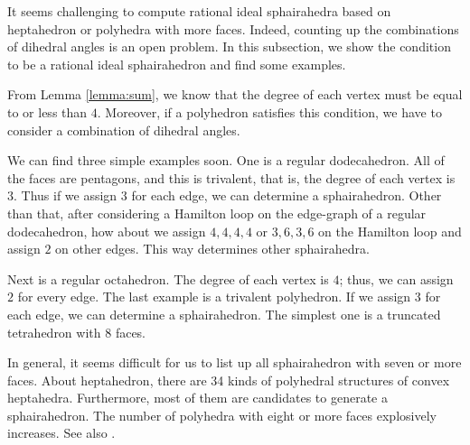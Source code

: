 \documentclass[suppldata, dvipdfmx]{interact}
\theoremstyle{plain}%
\theoremstyle{definition}
\theoremstyle{remark}
\theoremstyle{problemstyle}
\begin{document}
It seems challenging to compute rational ideal sphairahedra based on
heptahedron or polyhedra with more faces.
Indeed, counting up the combinations of dihedral angles is an open problem.  In this subsection, we show the condition to be a rational ideal sphairahedron and find some examples. 

From Lemma \ref{lemma:sum},  we know that the degree of each vertex must be equal to or less than $4$.  Moreover, if a polyhedron satisfies this condition, we have to consider a combination of dihedral angles. 

We can find three simple examples soon.  One is a regular dodecahedron.  All of the faces are pentagons, and this is trivalent, that is, the degree of each vertex is $3$.  Thus if we assign $3$ for each edge,  we can determine a sphairahedron.  Other than that, after considering a Hamilton loop on the edge-graph of a regular dodecahedron, how about we assign $4,4,4,4$ or $3,6,3,6$ on the Hamilton loop and assign $2$ on other edges.  This way determines other sphairahedra.  

Next is a regular octahedron.  The degree of each vertex is $4$; thus, we can assign $2$ for every edge.
The last example is a trivalent polyhedron.   If we assign $3$ for each edge,  we can determine a sphairahedron.  The simplest one is a truncated tetrahedron with $8$ faces.

In general, it seems difficult for us to list up all sphairahedron with seven or more faces.  About heptahedron, there are 34 kinds of polyhedral structures of convex heptahedra.  Furthermore, most of them are candidates to generate a sphairahedron.  The number of polyhedra with eight or more faces explosively increases. See also \cite{countingPolyhedra}.



%
\end{document}
